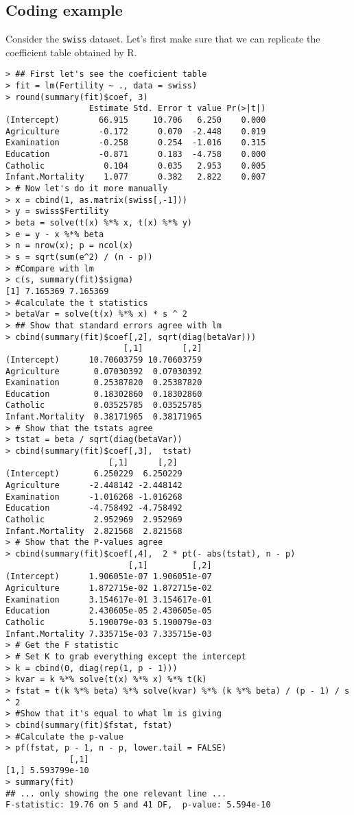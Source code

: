 \subsection{Coding example}

Consider the \texttt{swiss} dataset. Let's first make sure that we can replicate
the coefficient table obtained by R.
\begin{verbatim}
> ## First let's see the coeficient table
> fit = lm(Fertility ~ ., data = swiss)
> round(summary(fit)$coef, 3)
                 Estimate Std. Error t value Pr(>|t|)
(Intercept)        66.915     10.706   6.250    0.000
Agriculture        -0.172      0.070  -2.448    0.019
Examination        -0.258      0.254  -1.016    0.315
Education          -0.871      0.183  -4.758    0.000
Catholic            0.104      0.035   2.953    0.005
Infant.Mortality    1.077      0.382   2.822    0.007
> # Now let's do it more manually
> x = cbind(1, as.matrix(swiss[,-1]))
> y = swiss$Fertility
> beta = solve(t(x) %*% x, t(x) %*% y)
> e = y - x %*% beta
> n = nrow(x); p = ncol(x)
> s = sqrt(sum(e^2) / (n - p))
> #Compare with lm
> c(s, summary(fit)$sigma)
[1] 7.165369 7.165369
> #calculate the t statistics
> betaVar = solve(t(x) %*% x) * s ^ 2 
> ## Show that standard errors agree with lm
> cbind(summary(fit)$coef[,2], sqrt(diag(betaVar)))
                        [,1]        [,2]
(Intercept)      10.70603759 10.70603759
Agriculture       0.07030392  0.07030392
Examination       0.25387820  0.25387820
Education         0.18302860  0.18302860
Catholic          0.03525785  0.03525785
Infant.Mortality  0.38171965  0.38171965
> # Show that the tstats agree
> tstat = beta / sqrt(diag(betaVar))
> cbind(summary(fit)$coef[,3],  tstat)
                     [,1]      [,2]
(Intercept)       6.250229  6.250229
Agriculture      -2.448142 -2.448142
Examination      -1.016268 -1.016268
Education        -4.758492 -4.758492
Catholic          2.952969  2.952969
Infant.Mortality  2.821568  2.821568
> # Show that the P-values agree
> cbind(summary(fit)$coef[,4],  2 * pt(- abs(tstat), n - p)
                         [,1]         [,2]
(Intercept)      1.906051e-07 1.906051e-07
Agriculture      1.872715e-02 1.872715e-02
Examination      3.154617e-01 3.154617e-01
Education        2.430605e-05 2.430605e-05
Catholic         5.190079e-03 5.190079e-03
Infant.Mortality 7.335715e-03 7.335715e-03
> # Get the F statistic
> # Set K to grab everything except the intercept
> k = cbind(0, diag(rep(1, p - 1)))
> kvar = k %*% solve(t(x) %*% x) %*% t(k)
> fstat = t(k %*% beta) %*% solve(kvar) %*% (k %*% beta) / (p - 1) / s ^ 2
> #Show that it's equal to what lm is giving
> cbind(summary(fit)$fstat, fstat)
> #Calculate the p-value
> pf(fstat, p - 1, n - p, lower.tail = FALSE)
             [,1]
[1,] 5.593799e-10
> summary(fit)
## ... only showing the one relevant line ...
F-statistic: 19.76 on 5 and 41 DF,  p-value: 5.594e-10
\end{verbatim}



